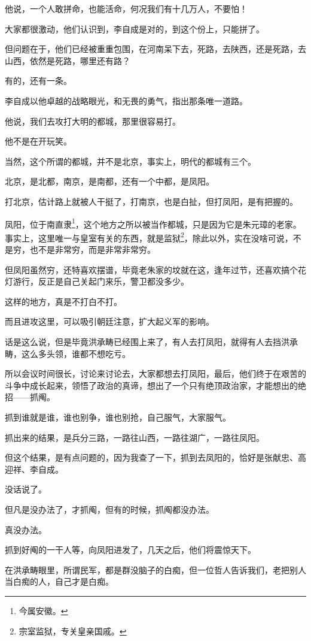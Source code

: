 \begin{multicols}{\theparacolNo}
		他说，一个人敢拼命，也能活命，何况我们有十几万人，不要怕！

		大家都很激动，他们认识到，李自成是对的，到这个份上，只能拼了。

		但问题在于，他们已经被重重包围，在河南呆下去，死路，去陕西，还是死路，去山西，依然是死路，哪里还有路？

		有的，还有一条。

		李自成以他卓越的战略眼光，和无畏的勇气，指出那条唯一道路。

		他说，我们去攻打大明的都城，那里很容易打。

		他不是在开玩笑。

		当然，这个所谓的都城，并不是北京，事实上，明代的都城有三个。

		北京，是北都，南京，是南都，还有一个中都，是凤阳。

		打北京，估计路上就被人干挺了，打南京，也是白扯，但打凤阳，是有把握的。

		凤阳，位于南直隶\footnote{今属安徽。}，这个地方之所以被当作都城，只是因为它是朱元璋的老家。事实上，这里唯一与皇室有关的东西，就是监狱\footnote{宗室监狱，专关皇亲国戚。}，除此以外，实在没啥可说，不是穷，也不是非常穷，而是非常非常穷。

		但凤阳虽然穷，还特喜欢摆谱，毕竟老朱家的坟就在这，逢年过节，还喜欢搞个花灯游行，反正是自己关起门来乐，警卫都没多少。

		这样的地方，真是不打白不打。

		而且进攻这里，可以吸引朝廷注意，扩大起义军的影响。

		话是这么说，但是毕竟洪承畴已经围上来了，有人去打凤阳，就得有人去挡洪承畴，这么多头领，谁都不想吃亏。

		所以会议时间很长，讨论来讨论去，大家都想去打凤阳，最后，他们终于在艰苦的斗争中成长起来，领悟了政治的真谛，想出了一个只有绝顶政治家，才能想出的绝招——抓阄。

		抓到谁就是谁，谁也别争，谁也别抢，自己服气，大家服气。

		抓出来的结果，是兵分三路，一路往山西，一路往湖广，一路往凤阳。

		但这个结果，是有点问题的，因为我查了一下，抓到去凤阳的，恰好是张献忠、高迎祥、李自成。

		没话说了。

		但凡是没办法了，才抓阄，但有的时候，抓阄都没办法。

		真没办法。

		抓到好阄的一干人等，向凤阳进发了，几天之后，他们将震惊天下。

		在洪承畴眼里，所谓民军，都是群没脑子的白痴，但一位哲人告诉我们，老把别人当白痴的人，自己才是白痴。


\end{multicols}
